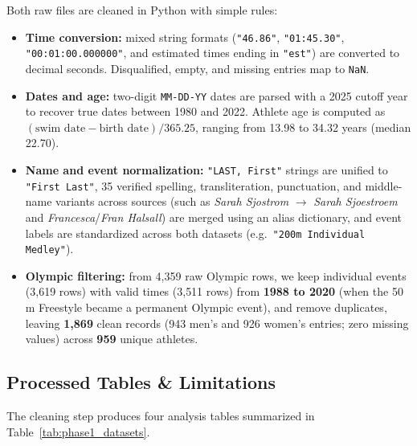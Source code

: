 \documentclass[11pt, a4paper]{article}
\begin{document}
Both raw files are cleaned in Python with simple rules:
\begin{itemize}
    \item \textbf{Time conversion:} mixed string formats (\texttt{"46.86"}, \texttt{"01:45.30"}, \texttt{"00:01:00.000000"}, and estimated times ending in \texttt{"est"}) are converted to decimal seconds. Disqualified, empty, and missing entries map to \texttt{NaN}.

    \item \textbf{Dates and age:} two-digit \texttt{MM-DD-YY} dates are parsed with a 2025 cutoff year to recover true dates between 1980 and 2022. Athlete age is computed as $(\text{swim date} - \text{birth date}) / 365.25$, ranging from 13.98 to 34.32 years (median 22.70).

    \item \textbf{Name and event normalization:} \texttt{"LAST, First"} strings are unified to \texttt{"First Last"}, 35 verified spelling, transliteration, punctuation, and middle-name variants across sources (such as \textit{Sarah Sjostrom} $\to$ \textit{Sarah Sjoestroem} and \textit{Francesca}/\textit{Fran Halsall}) are merged using an alias dictionary, and event labels are standardized across both datasets (e.g.\ \texttt{"200m Individual Medley"}).

    \item \textbf{Olympic filtering:} from 4{,}359 raw Olympic rows, we keep individual events (3{,}619 rows) with valid times (3{,}511 rows) from \textbf{1988 to 2020} (when the 50\,m Freestyle became a permanent Olympic event), and remove duplicates, leaving \textbf{1{,}869} clean records (943 men's and 926 women's entries; zero missing values) across \textbf{959} unique athletes.
\end{itemize}

\subsection{Processed Tables \texorpdfstring{\&}{and} Limitations}

The cleaning step produces four analysis tables summarized in Table~\ref{tab:phase1_datasets}.
\end{document}
